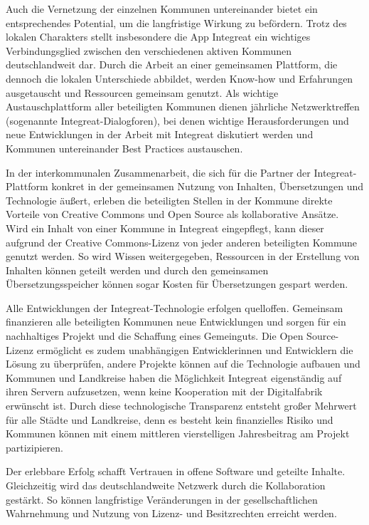 \documentclass[12pt, a4paper]{article} %
\begin{document}
Auch die Vernetzung der einzelnen Kommunen untereinander bietet ein
entsprechendes Potential, um die langfristige Wirkung zu befördern.
Trotz des lokalen Charakters stellt insbesondere die App Integreat ein
wichtiges Verbindungsglied zwischen den verschiedenen aktiven Kommunen
deutschlandweit dar. Durch die Arbeit an einer gemeinsamen Plattform,
die dennoch die lokalen Unterschiede abbildet, werden Know-how und
Erfahrungen ausgetauscht und Ressourcen gemeinsam genutzt. Als wichtige
Austauschplattform aller beteiligten Kommunen dienen jährliche
Netzwerktreffen (sogenannte Integreat-Dialogforen), bei denen wichtige
Herausforderungen und neue Entwicklungen in der Arbeit mit Integreat
diskutiert werden und Kommunen untereinander Best Practices austauschen.

In der interkommunalen Zusammenarbeit, die sich für die Partner der
Integreat-Plattform konkret in der gemeinsamen Nutzung von Inhalten,
Übersetzungen und Technologie äußert, erleben die beteiligten Stellen in
der Kommune direkte Vorteile von Creative Commons und Open Source als
kollaborative Ansätze. Wird ein Inhalt von einer Kommune in Integreat
eingepflegt, kann dieser aufgrund der Creative Commons-Lizenz von jeder
anderen beteiligten Kommune genutzt werden. So wird Wissen
weitergegeben, Ressourcen in der Erstellung von Inhalten können geteilt
werden und durch den gemeinsamen Übersetzungsspeicher können sogar
Kosten für Übersetzungen gespart werden.

Alle Entwicklungen der Integreat-Technologie erfolgen quelloffen.
Gemeinsam finanzieren alle beteiligten Kommunen neue Entwicklungen und
sorgen für ein nachhaltiges Projekt und die Schaffung eines Gemeinguts.
Die Open Source-Lizenz ermöglicht es zudem unabhängigen Entwicklerinnen
und Entwicklern die Lösung zu überprüfen, andere Projekte können auf die
Technologie aufbauen und Kommunen und Landkreise haben die Möglichkeit
Integreat eigenständig auf ihren Servern aufzusetzen, wenn keine
Kooperation mit der Digitalfabrik erwünscht ist. Durch diese
technologische Transparenz entsteht großer Mehrwert für alle Städte und
Landkreise, denn es besteht kein finanzielles Risiko und Kommunen können
mit einem mittleren vierstelligen Jahresbeitrag am Projekt
partizipieren.

Der erlebbare Erfolg schafft Vertrauen in offene Software und geteilte
Inhalte. Gleichzeitig wird das deutschlandweite Netzwerk durch die
Kollaboration gestärkt. So können langfristige Veränderungen in der
gesellschaftlichen Wahrnehmung und Nutzung von Lizenz- und Besitzrechten
erreicht werden.
\end{document}
